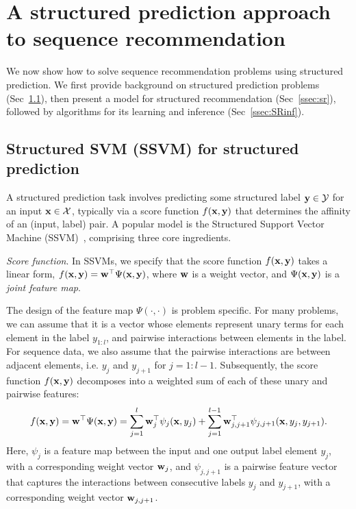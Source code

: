 \secmoveup
\section{A structured prediction approach to sequence recommendation}
\label{sec:recseq}
\textmoveup

We now show how to solve sequence recommendation problems using structured prediction.
We first provide background on structured prediction problems (Sec~\ref{ssec:ssvm}),
then present a model for structured recommendation (Sec~\ref{ssec:sr}),
followed by algorithms for its learning %
and inference (Sec~\ref{ssec:SRinf}).


\secmoveup
\subsection{Structured SVM (SSVM) for structured prediction}
\label{ssec:ssvm}
\textmoveup

A structured prediction task involves predicting some structured label $\mathbf{y} \in \mathcal{Y}$ for an input $\mathbf{x} \in \mathcal{X}$,
typically via a score function $f(\mathbf{x},\mathbf{y})$ that determines the affinity of an (input, label) pair.
A popular model is the Structured Support Vector Machine (SSVM)~\cite{joachims2009predicting,tsochantaridis2005large}, comprising three core ingredients.

\emph{Score function}. In SSVMs, we specify that the score function $f(\mathbf{x}, \mathbf{y})$ takes a linear form, \ie 
$f(\mathbf{x}, \mathbf{y}) = \mathbf{w}^\top \Psi(\mathbf{x}, \mathbf{y})$,
where $\mathbf{w}$ is a weight vector, and $\Psi(\mathbf{x}, \mathbf{y})$ is a \emph{joint feature map}.

The design of the feature map $\Psi(\cdot,\cdot)$ is problem specific.
For many problems, we can assume that it is a vector whose elements represent unary
terms for each element in the label $y_{1:l}$, and pairwise interactions between elements in the label.
For sequence data, %
we also assume that the pairwise interactions are between
adjacent elements, i.e. $y_j$ and $y_{j+1}$ for $j=1 : l \!-\! 1$.
Subsequently, the score function $f(\mathbf{x},\mathbf{y})$ decomposes into a weighted sum of
each of these unary and pairwise features: %
\begin{equation}
\label{eq:jointfeature}
f(\mathbf{x}, \mathbf{y}) = \mathbf{w}^\top \Psi(\mathbf{x}, \mathbf{y}) = 
\sum_{j=1}^l \mathbf{w}_j^\top \psi_j(\mathbf{x}, y_j) + \sum_{j=1}^{l-1} \mathbf{w}_{j,j+1}^\top \psi_{j,j+1}(\mathbf{x}, y_{j}, y_{j+1}).
\end{equation}
Here, $\psi_j$ is a feature map between the input and one output label element $y_j$, with a corresponding weight vector $\mathbf{w}_j$,
and $\psi_{j,j+1}$ is a pairwise feature vector that captures the interactions between consecutive labels $y_j$ and $y_{j+1}$,
with a corresponding weight vector $\mathbf{w}_{j,j+1}$.


